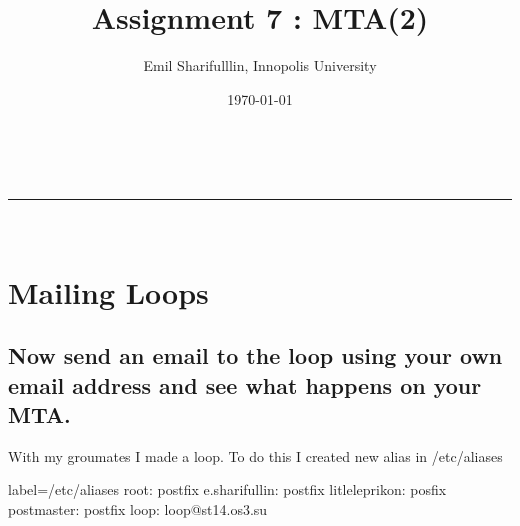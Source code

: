 \documentclass[a4paper,11pt]{article}
\makeatletter
\newcommand*{\TitleFont}{%
      \usefont{\encodingdefault}{\rmdefault}{b}{n}%
      \fontsize{16}{20}%
      \selectfont}
\renewcommand{\maketitle}{
\begin{center}
\vspace{2ex}
{\huge \textsc{\@title}}
\vspace{1ex}
\\
\rule{\linewidth}{0.5pt}\\
\@author \hfill \@date
\vspace{4ex}
\end{center}
}
\makeatother
\begin{document}






\title{ \TitleFont Assignment 7 : MTA(2) }

\author{Emil Sharifulllin, Innopolis University}

\date{\today}

\maketitle

\tableofcontents

\section{Mailing Loops}
\subsection{Now send an email to the loop using your own email address and see what happens on your MTA.}
With my groumates I made a loop. To do this I created new alias in /etc/aliases

\begin{bashcode*}{label=/etc/aliases}
root: postfix 
e.sharifullin: postfix
litleleprikon: posfix
postmaster: postfix
loop: loop@st14.os3.su
\end{bashcode*}
\end{document}
